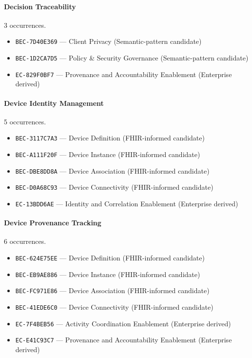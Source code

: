 \documentclass[11pt,a4paper,openany]{book}
\begin{document}
\paragraph{Decision Traceability} 3 occurrences.\par
\begin{itemize}
\item \texttt{BEC-7D40E369} --- Client Privacy (Semantic-pattern candidate)
\item \texttt{BEC-1D2CA7D5} --- Policy \& Security Governance (Semantic-pattern candidate)
\item \texttt{EC-829F0BF7} --- Provenance and Accountability Enablement (Enterprise derived)
\end{itemize}
\paragraph{Device Identity Management} 5 occurrences.\par
\begin{itemize}
\item \texttt{BEC-3117C7A3} --- Device Definition (FHIR-informed candidate)
\item \texttt{BEC-A111F20F} --- Device Instance (FHIR-informed candidate)
\item \texttt{BEC-DBE8DD8A} --- Device Association (FHIR-informed candidate)
\item \texttt{BEC-D0A68C93} --- Device Connectivity (FHIR-informed candidate)
\item \texttt{EC-13BDD6AE} --- Identity and Correlation Enablement (Enterprise derived)
\end{itemize}
\paragraph{Device Provenance Tracking} 6 occurrences.\par
\begin{itemize}
\item \texttt{BEC-624E75EE} --- Device Definition (FHIR-informed candidate)
\item \texttt{BEC-EB9AE886} --- Device Instance (FHIR-informed candidate)
\item \texttt{BEC-FC971E86} --- Device Association (FHIR-informed candidate)
\item \texttt{BEC-41EDE6C0} --- Device Connectivity (FHIR-informed candidate)
\item \texttt{EC-7F4BEB56} --- Activity Coordination Enablement (Enterprise derived)
\item \texttt{EC-E41C93C7} --- Provenance and Accountability Enablement (Enterprise derived)
\end{itemize}
\end{document}
